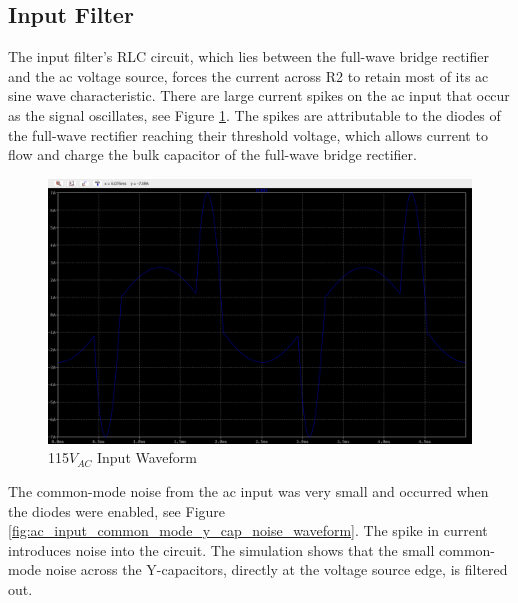 \documentclass[conference]{IEEEtran}
\begin{document}
\subsection{Input Filter}

The input filter's RLC circuit, which lies between the full-wave bridge rectifier and the ac voltage source, forces the current across R2 to retain most of its ac sine wave characteristic. There are large current spikes on the ac input that occur as the signal oscillates, see Figure \ref{fig:ac_input_waveform}. The spikes are attributable to the diodes of the full-wave rectifier reaching their threshold voltage, which allows current to flow and charge the bulk capacitor of the full-wave bridge rectifier.

\begin{figure}[htp]
    \centering
    \includegraphics[width=1.0\linewidth]{ac_input_waveform.png}
    \caption{115$V_{AC}$ Input Waveform}
    \label{fig:ac_input_waveform}
\end{figure}

The common-mode noise from the ac input was very small and occurred when the diodes were enabled, see Figure \ref{fig:ac_input_common_mode_y_cap_noise_waveform}. The spike in current introduces noise into the circuit. The simulation shows that the small common-mode noise across the Y-capacitors, directly at the voltage source edge, is filtered out.
\end{document}
